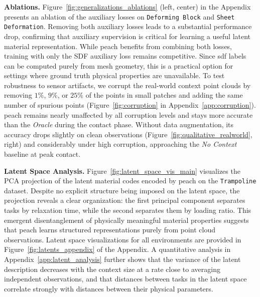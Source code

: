 \textbf{Ablations.}
Figure~\ref{fig:generalizations_ablations} (left, center) in the Appendix presents an ablation of the auxiliary losses on \texttt{Deforming Block} and \texttt{Sheet Deformation}.
Removing both auxiliary losses leads to a substantial performance drop, confirming that auxiliary supervision is critical for learning a useful latent material representation.
While \gls{peach} benefits from combining both losses, training with only the SDF auxiliary loss remains competitive.
Since \gls{sdf} labels can be computed purely from mesh geometry, this is a practical option for settings where ground truth physical properties are unavailable.
To test robustness to sensor artifacts, we corrupt the real-world context point clouds by removing $1\%$, $9\%$, or $25\%$ of the points in small patches and adding the same number of spurious points (Figure~\ref{fig:corruption} in Appendix~\ref{app:corruption}).
\gls{peach} remains nearly unaffected by all corruption levels and stays more accurate than the \textit{Oracle} during the contact phase.
Without data augmentation, its accuracy drops slightly on clean observations (Figure~\ref{fig:qualitative_realworld}, right) and considerably under high corruption, approaching the \textit{No Context} baseline at peak contact.


\textbf{Latent Space Analysis.}
Figure~\ref{fig:latent_space_vis_main} visualizes the PCA projection of the latent material codes encoded by \gls{peach} on the \texttt{Trampoline} dataset.
Despite no explicit structure being imposed on the latent space, the projection reveals a clear organization: the first principal component separates tasks by relaxation time, while the second separates them by loading ratio.
This emergent disentanglement of physically meaningful material properties suggests that \gls{peach} learns structured representations purely from point cloud observations. Latent space visualizations for all environments are provided in Figure~\ref{fig:latents_appendix} of the Appendix. A quantitative analysis in Appendix~\ref{app:latent_analysis} further shows that the variance of the latent description decreases with the context size at a rate close to averaging independent observations, and that distances between tasks in the latent space correlate strongly with distances between their physical parameters.



